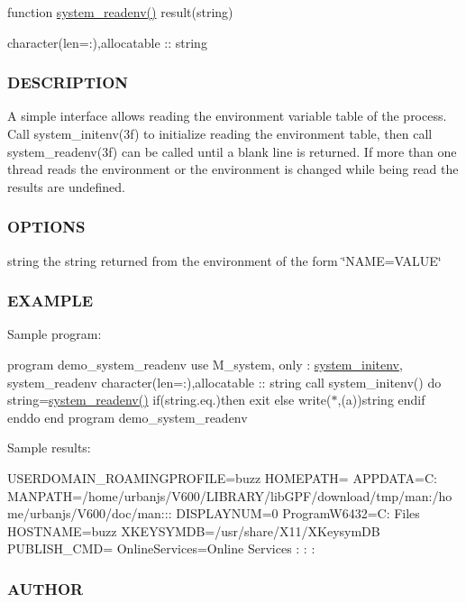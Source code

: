 function \mbox{\hyperlink{namespacem__system_ae0e43010a82a6a25402568ccb326322d}{system\+\_\+readenv()}} result(string)

character(len=\+:),allocatable \+:\+: string \subsubsection*{D\+E\+S\+C\+R\+I\+P\+T\+I\+ON}

A simple interface allows reading the environment variable table of the process. Call system\+\_\+initenv(3f) to initialize reading the environment table, then call system\+\_\+readenv(3f) can be called until a blank line is returned. If more than one thread reads the environment or the environment is changed while being read the results are undefined. \subsubsection*{O\+P\+T\+I\+O\+NS}

string the string returned from the environment of the form \char`\"{}\+N\+A\+M\+E=\+V\+A\+L\+U\+E\char`\"{}

\subsubsection*{E\+X\+A\+M\+P\+LE}

Sample program\+:

program demo\+\_\+system\+\_\+readenv use M\+\_\+system, only \+: \mbox{\hyperlink{interfacem__system_1_1system__initenv}{system\+\_\+initenv}}, system\+\_\+readenv character(len=\+:),allocatable \+:\+: string call system\+\_\+initenv() do string=\mbox{\hyperlink{namespacem__system_ae0e43010a82a6a25402568ccb326322d}{system\+\_\+readenv()}} if(string.\+eq.\textquotesingle{}\textquotesingle{})then exit else write($\ast$,\textquotesingle{}(a)\textquotesingle{})string endif enddo end program demo\+\_\+system\+\_\+readenv

Sample results\+:

U\+S\+E\+R\+D\+O\+M\+A\+I\+N\+\_\+\+R\+O\+A\+M\+I\+N\+G\+P\+R\+O\+F\+I\+LE=buzz H\+O\+M\+E\+P\+A\+TH= A\+P\+P\+D\+A\+TA=C\+: M\+A\+N\+P\+A\+TH=/home/urbanjs/\+V600/\+L\+I\+B\+R\+A\+R\+Y/lib\+G\+P\+F/download/tmp/man\+:/home/urbanjs/\+V600/doc/man\+:\+:\+: D\+I\+S\+P\+L\+A\+Y\+N\+UM=0 Program\+W6432=C\+: Files H\+O\+S\+T\+N\+A\+ME=buzz X\+K\+E\+Y\+S\+Y\+M\+DB=/usr/share/\+X11/\+X\+Keysym\+DB P\+U\+B\+L\+I\+S\+H\+\_\+\+C\+MD= Online\+Services=Online Services \+: \+: \+: \subsubsection*{A\+U\+T\+H\+OR}

